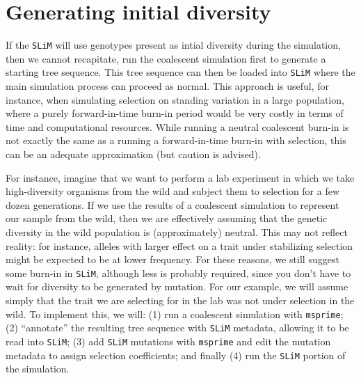\documentclass[12pt]{article}
\newcommand{\msprime}[0]{\texttt{msprime}\xspace}
\newcommand{\slim}[0]{\texttt{SLiM}\xspace}
\begin{document}
\section{Generating initial diversity} %

If the \slim will use genotypes present as intial diversity during the simulation,
then we cannot recapitate,
run the coalescent simulation first to generate a starting tree sequence.
This tree sequence can then be loaded into \slim where the main simulation process can proceed as normal.
This approach is useful, for instance, when simulating selection on standing variation in a large population,
where a purely forward-in-time burn-in period would be very costly in terms of time and computational resources.
While running a neutral coalescent burn-in is not exactly the same as a running a forward-in-time burn-in with selection,
this can be an adequate approximation (but caution is advised).

For instance,
imagine that we want to perform a lab experiment in which we take high-diversity
organisms from the wild and subject them to selection for a few dozen generations.
If we use the results of a coalescent simulation to represent our sample from the wild,
then we are effectively assuming that the genetic diversity in the wild population is (approximately) neutral.
This may not reflect reality: for instance,
alleles with larger effect on a trait under stabilizing selection might be expected to be at lower frequency.
For these reasons, we still suggest some burn-in in \slim,
although less is probably required, since you don't have to wait for diversity to be generated by mutation.
For our example, we will assume simply that the trait we are selecting for in the lab was
not under selection in the wild. To implement this, we will:
(1) run a coalescent simulation with \msprime;
(2) ``annotate'' the resulting tree sequence with \slim metadata, allowing it to be read into \slim;
(3) add \slim mutations with \msprime
        and edit the mutation metadata to assign selection coefficients; and finally
(4) run the \slim portion of the simulation.
\end{document}
